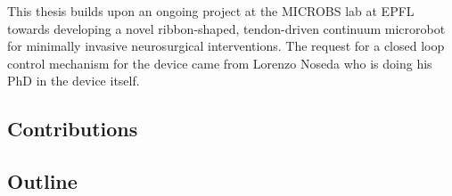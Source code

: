This thesis builds upon an ongoing project at the MICROBS lab at EPFL towards developing a novel ribbon-shaped, tendon-driven continuum microrobot for minimally invasive neurosurgical interventions. The request for a closed loop control mechanism for the device came from Lorenzo Noseda who is doing his PhD in the device itself. 




\subsection{Contributions}


\subsection{Outline}


